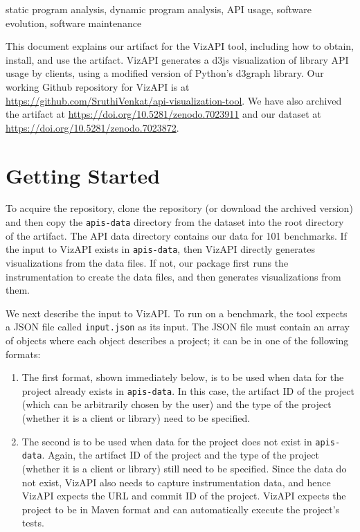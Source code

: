 \documentclass[conference]{IEEEtran}
\begin{document}
\begin{IEEEkeywords}
static program analysis,
dynamic program analysis,
API usage,
software evolution,
software maintenance
\end{IEEEkeywords}


This document explains our artifact for the VizAPI tool, including how to obtain, install, and use the artifact. VizAPI generates a d3js visualization of library API usage by clients, using a modified version of Python's d3graph library. Our working Github repository for VizAPI is at \href{https://github.com/SruthiVenkat/api-visualization-tool}{https://github.com/SruthiVenkat/api-visualization-tool}. We have also archived the artifact at \href{https://doi.org/10.5281/zenodo.7023911}{https://doi.org/10.5281/zenodo.7023911} and our dataset at \href{https://doi.org/10.5281/zenodo.7023872}{https://doi.org/10.5281/zenodo.7023872}.

\section{Getting Started}

To acquire the repository, clone the repository (or download the archived version) and then copy the \texttt{apis-data} directory from the dataset into the root directory of the artifact. The API data directory contains our data for 101 benchmarks. If the input to VizAPI exists in \texttt{apis-data}, then VizAPI directly generates visualizations from the data files. If not, our package first runs the instrumentation to create the data files, and then generates visualizations from them.

We next describe the input to VizAPI. To run on a benchmark, the tool expects a JSON file called \texttt{input.json} as its input. The JSON file must contain an array of objects where each object describes a project; it can be in one of the following formats:

\begin{enumerate}
\item The first format, shown immediately below, is to be used when data for the project already exists in \texttt{apis-data}. In this case, the artifact ID of the project (which can be arbitrarily chosen by the user) and the type of the project (whether it is a client or library) need to be specified.

\item The second is to be used when data for the project does not exist in \texttt{apis-data}. Again, the artifact ID of the project and the type of the project (whether it is a client or library) still need to be specified. Since the data do not exist, VizAPI also needs to capture instrumentation data, and hence VizAPI expects the URL and commit ID of the project. VizAPI expects the project to be in Maven format and can automatically execute the project's tests.

\end{enumerate}
\end{document}
